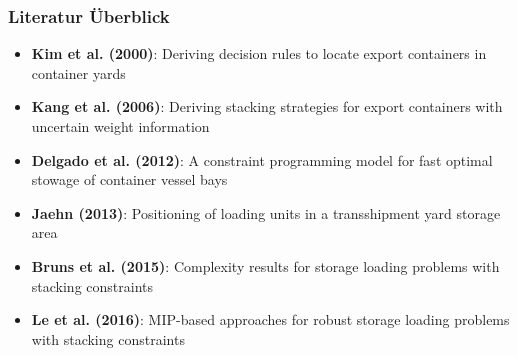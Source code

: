 \documentclass{beamer}
\begin{document}
\begin{frame}
\frametitle{Literatur Überblick}

\begin{itemize}
  \item \textbf{Kim et al. (2000)}: Deriving decision rules to locate export containers in container yards
  \item \textbf{Kang et al. (2006)}: Deriving stacking strategies for export containers with uncertain weight information
  \item \textbf{Delgado et al. (2012)}: A constraint programming model for fast optimal stowage of container vessel bays
  \item \textbf{Jaehn (2013)}: Positioning of loading units in a transshipment yard storage area
  \item \textbf{Bruns et al. (2015)}: Complexity results for storage loading problems with stacking constraints
  \item \textbf{Le et al. (2016)}: MIP-based approaches for robust storage loading problems with stacking constraints
\end{itemize}

\end{frame}
\end{document}
